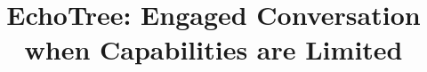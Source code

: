 \documentclass{sigchi}
\begin{document}
\title{EchoTree: Engaged Conversation when Capabilities are Limited}






\maketitle
\end{document}
